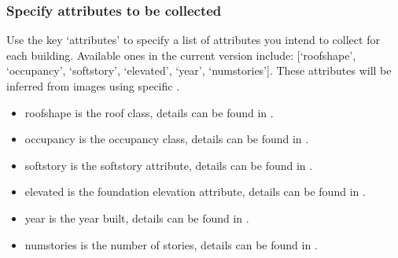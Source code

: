 \documentclass[letterpaper,10pt,english]{sphinxmanual}
\begin{document}
\subsubsection{Specify attributes to be collected}
\label{\detokenize{common/user_manual/workflow:specify-attributes-to-be-collected}}
\sphinxAtStartPar
Use the key ‘attributes’ to specify a list of attributes you intend to collect for each building.
Available ones in the current version include:
{[}‘roofshape’,
‘occupancy’,
‘softstory’,
‘elevated’,
‘year’,
‘numstories’{]}.
These attributes will be inferred from images using specific {\hyperref[\detokenize{common/user_manual/modules/modules:lbl-modules}]{}}.
\begin{itemize}
\item {} 
\sphinxAtStartPar
roofshape is the roof class, details can be found in {\hyperref[\detokenize{common/user_manual/modules/roofClassifier:lbl-roofclassifier}]{}}.

\item {} 
\sphinxAtStartPar
occupancy is the occupancy class, details can be found in {\hyperref[\detokenize{common/user_manual/modules/occupancyClassifier:lbl-occupancyclassifier}]{}}.

\item {} 
\sphinxAtStartPar
softstory is the soft\sphinxhyphen{}story attribute, details can be found in {\hyperref[\detokenize{common/user_manual/modules/softstoryClassifier:lbl-softstoryclassifier}]{}}.

\item {} 
\sphinxAtStartPar
elevated is the foundation elevation attribute, details can be found in {\hyperref[\detokenize{common/user_manual/modules/foundationElevationClassifier:lbl-foundationelevationclassifier}]{}}.

\item {} 
\sphinxAtStartPar
year is the year built, details can be found in {\hyperref[\detokenize{common/user_manual/modules/yearClassifier:lbl-yearclassifier}]{}}.

\item {} 
\sphinxAtStartPar
numstories is the number of stories, details can be found in {\hyperref[\detokenize{common/user_manual/modules/nFloorDetector:lbl-nfloordetector}]{}}.

\end{itemize}
\end{document}
